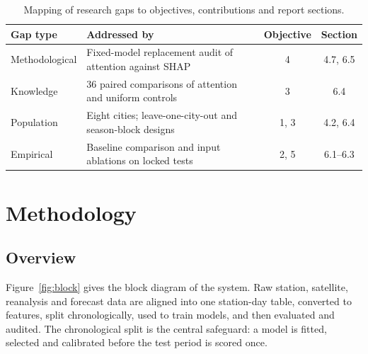 \documentclass[pdflatex,sn-mathphys-num]{sn-jnl}
\begin{document}
\begin{table}[!htbp]
\centering
\small
\caption{Mapping of research gaps to objectives, contributions and report sections.}\label{tab:gaps}
\begin{tabular}{llcc}
\toprule
\textbf{Gap type} & \textbf{Addressed by} & \textbf{Objective} & \textbf{Section} \\
\midrule
Methodological & Fixed-model replacement audit of attention against SHAP & 4 & 4.7, 6.5 \\
Knowledge & 36 paired comparisons of attention and uniform controls & 3 & 6.4 \\
Population & Eight cities; leave-one-city-out and season-block designs & 1, 3 & 4.2, 6.4 \\
Empirical & Baseline comparison and input ablations on locked tests & 2, 5 & 6.1--6.3 \\
\bottomrule
\end{tabular}
\end{table}

\section{Methodology}\label{sec:method}

\subsection{Overview}
Figure~\ref{fig:block} gives the block diagram of the system. Raw station, satellite, reanalysis and forecast data are aligned into one station-day table, converted to features, split chronologically, used to train models, and then evaluated and audited. The chronological split is the central safeguard: a model is fitted, selected and calibrated before the test period is scored once.
\end{document}
